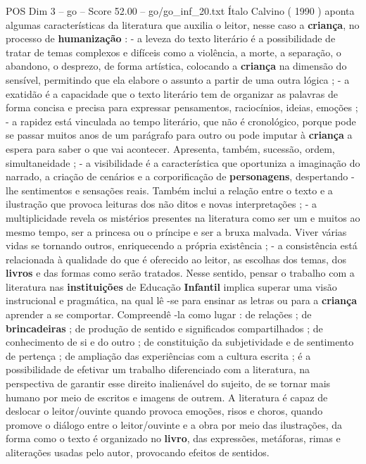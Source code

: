 \begin{textsample}{POS Dim 3 – go – Score 52.00 – go/go\_inf\_20.txt}
Ítalo Calvino ( 1990 ) aponta algumas características da literatura que auxilia o leitor, nesse caso a \textbf{criança}, no processo de \textbf{humanização} : - a leveza do texto literário é a possibilidade de tratar de temas complexos e difíceis como a violência, a morte, a separação, o abandono, o desprezo, de forma artística, colocando a \textbf{criança} na dimensão do sensível, permitindo que ela elabore o assunto a partir de uma outra lógica ; - a exatidão é a capacidade que o texto literário tem de organizar as palavras de forma concisa e precisa para expressar pensamentos, raciocínios, ideias, emoções ; - a rapidez está vinculada ao tempo literário, que não é cronológico, porque pode se passar muitos anos de um parágrafo para outro ou pode imputar à \textbf{criança} a espera para saber o que vai acontecer.
Apresenta, também, sucessão, ordem, simultaneidade ; - a visibilidade é a característica que oportuniza a imaginação do narrado, a criação de cenários e a corporificação de \textbf{personagens}, despertando -lhe sentimentos e sensações reais.
Também inclui a relação entre o texto e a ilustração que provoca leituras dos não ditos e novas interpretações ; - a multiplicidade revela os mistérios presentes na literatura como ser um e muitos ao mesmo tempo, ser a princesa ou o príncipe e ser a bruxa malvada.
Viver várias vidas se tornando outros, enriquecendo a própria existência ; - a consistência está relacionada à qualidade do que é oferecido ao leitor, as escolhas dos temas, dos \textbf{livros} e das formas como serão tratados.
Nesse sentido, pensar o trabalho com a literatura nas \textbf{instituições} de Educação \textbf{Infantil} implica superar uma visão instrucional e pragmática, na qual lê -se para ensinar as letras ou para a \textbf{criança} aprender a se comportar.
Compreendê -la como lugar : de relações ; de \textbf{brincadeiras} ; de produção de sentido e significados compartilhados ; de conhecimento de si e do outro ; de constituição da subjetividade e de sentimento de pertença ; de ampliação das experiências com a cultura escrita ; é a possibilidade de efetivar um trabalho diferenciado com a literatura, na perspectiva de garantir esse direito inalienável do sujeito, de se tornar mais humano por meio de escritos e imagens de outrem.
A literatura é capaz de deslocar o leitor/ouvinte quando provoca emoções, risos e choros, quando promove o diálogo entre o leitor/ouvinte e a obra por meio das ilustrações, da forma como o texto é organizado no \textbf{livro}, das expressões, metáforas, rimas e aliterações usadas pelo autor, provocando efeitos de sentidos.

\end{textsample}
